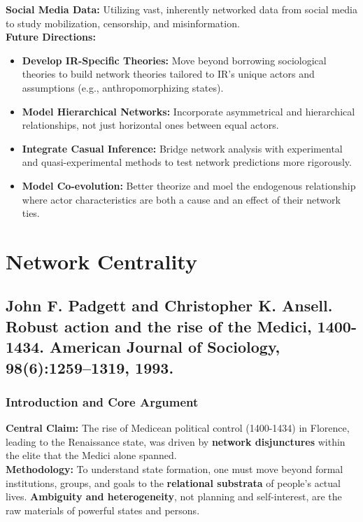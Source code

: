 \documentclass{article}
\begin{document}
    \noindent \textbf{Social Media Data:} Utilizing vast, inherently
networked data from social media to study mobilization, censorship, and
misinformation.\\

    \noindent \textbf{Future Directions:}
    \begin{itemize}
        \item \textbf{Develop IR-Specific Theories:} Move beyond borrowing
        sociological theories to build network theories tailored to IR's
        unique actors and assumptions (e.g., anthropomorphizing states).
        \item \textbf{Model Hierarchical Networks:} Incorporate asymmetrical
        and hierarchical relationships, not just horizontal ones between
        equal actors.
        \item \textbf{Integrate Casual Inference:} Bridge network analysis
        with experimental and quasi-experimental methods to test network
        predictions more rigorously.
        \item \textbf{Model Co-evolution:} Better theorize and moel the
        endogenous relationship where actor characteristics are both a cause
        and an effect of their network ties.
    \end{itemize}


    \section{Network Centrality}
    \subsection{John F. Padgett and Christopher K. Ansell. Robust action and the rise of the Medici, 1400-1434. American Journal of Sociology, 98(6):1259–1319, 1993.}
    \subsubsection{Introduction and Core Argument}

    \noindent \textbf{Central Claim:} The rise of Medicean political
control (1400-1434) in Florence, leading to the Renaissance state, was
driven by \textbf{network disjunctures} within the elite that the Medici
alone spanned.\\

    \noindent \textbf{Methodology:} To understand state formation, one must
move beyond formal institutions, groups, and goals to the
\textbf{relational substrata} of people's actual lives.
\textbf{Ambiguity and heterogeneity}, not planning and self-interest, are
the raw materials of powerful states and persons.\\
\end{document}
